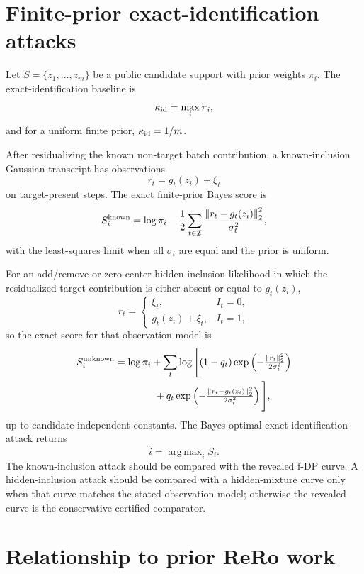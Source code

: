 \documentclass[conference,compsoc]{IEEEtran}
\DeclareMathOperator*{\argmax}{arg\,max}
\newcommand{\norm}[1]{\left\lVert #1\right\rVert}
\begin{document}
\section{Finite-prior exact-identification attacks}
\label{sec:finite-prior-attacks}

Let $S=\{z_1,\ldots,z_m\}$ be a public candidate support with prior weights
$\pi_i$.  The exact-identification baseline is
\[
\kappa_{\rm id}=\max_i\pi_i,
\]
and for a uniform finite prior, $\kappa_{\rm id}=1/m$.

After residualizing the known non-target batch contribution, a known-inclusion
Gaussian transcript has observations
\[
r_t=g_t(z_i)+\xi_t
\]
on target-present steps.  The exact finite-prior Bayes score is
\[
S_i^{\rm known}
=
\log\pi_i
-
\frac12
\sum_{t\in\mathcal I}
\frac{\norm{r_t-g_t(z_i)}_2^2}{\sigma_t^2},
\]
with the least-squares limit when all $\sigma_t$ are equal and the prior is
uniform.

For an add/remove or zero-center hidden-inclusion likelihood in which the
residualized target contribution is either absent or equal to $g_t(z_i)$,
\[
r_t=
\begin{cases}
\xi_t, & I_t=0,\\
g_t(z_i)+\xi_t, & I_t=1,
\end{cases}
\]
so the exact score for that observation model is
\begin{align*}
S_i^{\rm unknown}
&=
\log\pi_i
+
\sum_t
\log\Bigg[
(1-q_t)\exp\left(-\tfrac{\norm{r_t}_2^2}{2\sigma_t^2}\right)\\
&\qquad\qquad+
q_t\exp\left(-\tfrac{\norm{r_t-g_t(z_i)}_2^2}{2\sigma_t^2}\right)
\Bigg],
\end{align*}
up to candidate-independent constants.  The Bayes-optimal exact-identification
attack returns
\[
\widehat i=\argmax_i S_i.
\]
The known-inclusion attack should be compared with the revealed f-DP curve.  A
hidden-inclusion attack should be compared with a hidden-mixture curve only when
that curve matches the stated observation model; otherwise the revealed curve is
the conservative certified comparator.

\section{Relationship to prior ReRo work}
\label{sec:related}
\end{document}
